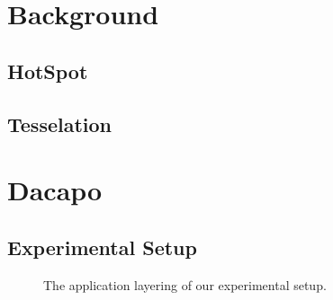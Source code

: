\documentclass{sig-alternate}
\begin{document}
\section{Background}

\subsection{HotSpot}


\subsection{Tesselation}


%

\section{Dacapo}


\subsection{Experimental Setup}
\begin{figure}
\centering
{}
\caption{The application layering of our experimental setup.}
\label{fig:dacaposetup}
\end{figure}
\end{document}
